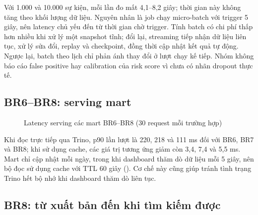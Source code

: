 Với 1.000 và 10.000 sự kiện, mỗi lần đo mất 4,1--8,2 giây; thời gian này không tăng theo khối lượng dữ liệu. Nguyên nhân là job chạy micro-batch với trigger 5 giây, nên latency chủ yếu đến từ thời gian chờ trigger. Tính batch có chi phí thấp hơn nhiều khi xử lý một snapshot tĩnh; đổi lại, streaming tiếp nhận dữ liệu liên tục, xử lý sửa đổi, replay và checkpoint, đồng thời cập nhật kết quả tự động. Ngược lại, batch theo lịch chỉ phản ánh thay đổi ở lượt chạy kế tiếp. Nhóm không báo cáo false positive hay calibration của risk score vì chưa có nhãn dropout thực tế.

\subsection{BR6--BR8: serving mart}

\begin{figure}[H]
\centering
{}
\caption{Latency serving các mart BR6--BR8 (30 request mỗi trường hợp)}
\label{fig:serving}
\end{figure}

Khi đọc trực tiếp qua Trino, p90 lần lượt là 220, 218 và 111 ms đối với BR6, BR7 và BR8; khi sử dụng cache, các giá trị tương ứng giảm còn 3,4, 7,4 và 5,5 ms. Mart chỉ cập nhật mỗi ngày, trong khi dashboard thăm dò dữ liệu mỗi 5 giây, nên bộ đọc sử dụng cache với TTL 60 giây (). Cơ chế này cũng giúp tránh tình trạng Trino hết bộ nhớ khi dashboard thăm dò liên tục.

\subsection{BR8: từ xuất bản đến khi tìm kiếm được}

